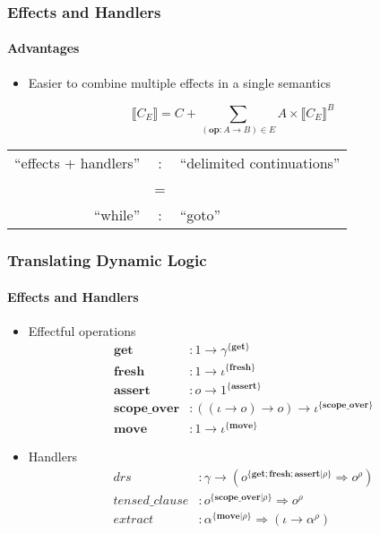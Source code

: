\documentclass{beamer}
\newcommand{\sem}[1]{\llbracket #1 \rrbracket}
\newcommand{\effect}[1]{\textbf{#1}}
\begin{document}
\begin{frame}
\frametitle{Effects and Handlers}
\framesubtitle{Advantages}

\begin{itemize}
\item Easier to combine multiple effects in a single semantics
  \parencite{cartwright1994extensible} \parencite{kiselyov2013extensible}
\end{itemize}
\vspace{6mm}
$$
\sem{C_E} = C + \sum_{(\effect{op} : A \to B) \in E} A \times \sem{C_E}^B
$$
\vspace{2mm}
\begin{center}
\setlength{\tabcolsep}{1pt}
\begin{tabular}{r c l}
  ``effects + handlers'' & : & ``delimited continuations'' \\
  & = & \\
  ``while'' & : & ``goto''
\end{tabular}
\end{center}
\begin{flushright}
  \parencite{bauer2012programming}
\end{flushright}
\end{frame}


\begin{frame}
  \frametitle{Translating Dynamic Logic}
  \framesubtitle{Effects and Handlers}
\begin{itemize}
\item Effectful operations
  \begin{align*}
    \effect{get} &: 1 \to \gamma^{\{\effect{get}\}} \\
    \effect{fresh} &: 1 \to \iota^{\{\effect{fresh}\}} \\
    \effect{assert} &: o \to 1^{\{\effect{assert}\}} \\
    \effect{scope\_over} &: ((\iota \to o) \to o) \to \iota^{\{\effect{scope\_over}\}} \\
    \effect{move} &: 1 \to \iota^{\{\effect{move}\}}
  \end{align*}

\item Handlers
  \begin{align*}
    drs &: \gamma \to (o^{\{\effect{get}; \effect{fresh}; \effect{assert}|\rho\}} \Rightarrow o^{\rho}) \\
    tensed\_clause &: o^{\{\effect{scope\_over}|\rho\}} \Rightarrow o^{\rho} \\
    extract &: \alpha^{\{\effect{move}|\rho\}} \Rightarrow (\iota \to \alpha^{\rho})
  \end{align*}
\end{itemize}
\end{frame}
\end{document}
